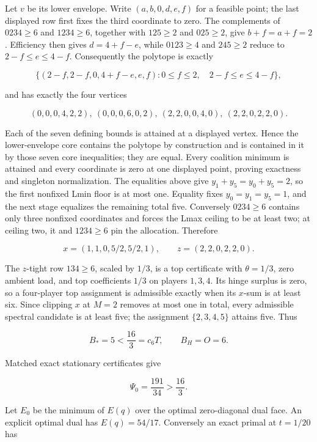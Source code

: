 \documentclass[11pt]{article}
\begin{document}
Let \(v\) be its lower envelope.  Write
\((a,b,0,d,e,f)\) for a feasible point; the last displayed row first fixes
the third coordinate to zero.  The complements of \(0234\ge6\) and
\(1234\ge6\), together with \(125\ge2\) and \(025\ge2\), give
\(b+f=a+f=2\).  Efficiency then gives \(d=4+f-e\), while
\(0123\ge4\) and \(245\ge2\) reduce to
\(2-f\le e\le4-f\).  Consequently the polytope is exactly

\[
 \{(2-f,2-f,0,4+f-e,e,f):0\le f\le2,\quad
       2-f\le e\le4-f\},
\]

and has exactly the four vertices

\[
 (0,0,0,4,2,2),\ (0,0,0,6,0,2),\
 (2,2,0,0,4,0),\ (2,2,0,2,2,0).
\]

Each of the seven defining bounds is attained at a displayed vertex.  Hence
the lower-envelope core contains the polytope by construction and is
contained in it by those seven core inequalities; they are equal.  Every
coalition minimum is attained and every coordinate is zero at one displayed
point, proving exactness and singleton normalization.  The equalities above
give \(y_1+y_5=y_0+y_5=2\), so the first nonfixed Lmin floor is at most one.
Equality fixes
\(y_0=y_1=y_5=1\), and the next stage equalizes the remaining total five.
Conversely \(0234\ge6\) contains only three nonfixed coordinates and forces
the Lmax ceiling to be at least two; at ceiling two, it and \(1234\ge6\)
pin the allocation.  Therefore

\begin{equation}
 x=(1,1,0,5/2,5/2,1),\qquad z=(2,2,0,2,2,0).             \tag{PXC139b}
\end{equation}

The \(z\)-tight row \(134\ge6\), scaled by \(1/3\), is a top certificate
with \(\theta=1/3\), zero ambient load, and top coefficients \(1/3\) on
players \(1,3,4\).  Its hinge surplus is zero, so a four-player top
assignment is admissible exactly when its \(x\)-sum is at least six.  Since
clipping \(x\) at \(M=2\) removes at most one in total, every admissible
spectral candidate is at least five; the assignment \(\{2,3,4,5\}\)
attains five.  Thus

\[
 B_*=5<\frac{16}{3}=c_6T,\qquad B_H=O=6.                \tag{PXC139c}
\]

Matched exact stationary certificates give

\[
 \Psi_0=\frac{191}{34}>\frac{16}{3}.
\]

Let \(E_0\) be the minimum of \(E(q)\) over the optimal zero-diagonal dual
face.  An explicit optimal dual has \(E(q)=54/17\).  Conversely an exact
primal at \(t=1/20\) has
\end{document}

